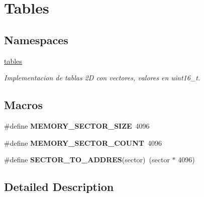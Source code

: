 \hypertarget{group__Tables}{}\section{Tables}
\label{group__Tables}
\subsection*{Namespaces}
\begin{DoxyCompactItemize}
\item 
 \hyperlink{namespacetables}{tables}
\begin{DoxyCompactList}\small\item\em Implementacion de tablas 2D con vectores, valores en uint16\+\_\+t. \end{DoxyCompactList}\end{DoxyCompactItemize}
\subsection*{Macros}
\begin{DoxyCompactItemize}
\item 
\mbox{\label{group__Tables_ga04fa27dc99bae1e676fd6a65695ab272}} 
\#define {\bfseries M\+E\+M\+O\+R\+Y\+\_\+\+S\+E\+C\+T\+O\+R\+\_\+\+S\+I\+ZE}~4096
\item 
\mbox{\label{group__Tables_ga9544ad8232a908fb374ab10dc85044ea}} 
\#define {\bfseries M\+E\+M\+O\+R\+Y\+\_\+\+S\+E\+C\+T\+O\+R\+\_\+\+C\+O\+U\+NT}~4096
\item 
\mbox{\label{group__Tables_ga79ab0f4b5245b5d5450e444591d470b2}} 
\#define {\bfseries S\+E\+C\+T\+O\+R\+\_\+\+T\+O\+\_\+\+A\+D\+D\+R\+ES}(sector)~(sector $\ast$ 4096)
\end{DoxyCompactItemize}


\subsection{Detailed Description}
